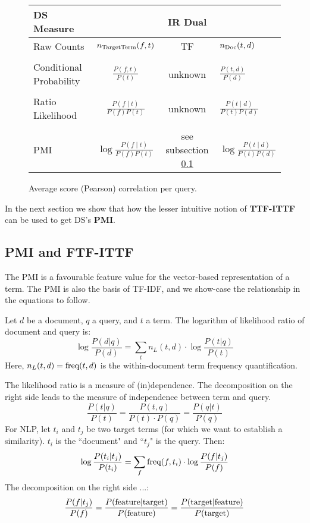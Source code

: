  
\begin{figure*}[htb]
  \centering
  \begin{tabular}{|l|c|c|l|}
  \hline
  DS Measure  && IR Dual &\\
  \hline
 Raw Counts  &$n_{\textmd{TargetTerm}}(f,t)$ & TF &$n_{\textmd{Doc}}(t,d)$\\
 &&&\\
 Conditional Probability &$ \frac{P(f,t)}{P(t)}$ & unknown &$\frac{P(t,d)}{P(d)}$\\
 &&&\\
 Ratio Likelihood & $\frac{P(f \mid t)}{P(f)P(t)}$ & unknown & $\frac{P(t \mid d)}{P(t)P(d)}$\\
 &&&\\
 PMI & $\log{\frac{P(f \mid t)}{P(f)P(t)}}$  & see  subsection \ref{PMI-TF-IDF}&$\log{\frac{P(t \mid d)}{P(t)P(d)}}$\\
 \hline
  \end{tabular}
  \caption{Average score (Pearson) correlation per query.}
  \label{tb-ds-ir}
\end{figure*}

  In the next section we show that how the lesser intuitive notion of  {\bf TTF-ITTF} can be used to get DS's {\bf PMI}. 

\subsection{PMI and FTF-ITTF}
\label{PMI-TF-IDF}

The PMI is a favourable feature value for the vector-based representation
of a term.
The PMI is also the basis of TF-IDF, and we show-case the relationship
in the equations to follow.

Let $d$ be a document, $q$ a query, and $t$ a term.
The logarithm of likelihood ratio of document and query is:
\[
\log\frac{P(d|q)}{P(d)} =
	\sum_t n_L(t,d) \cdot \log\frac{P(t|q)}{P(t)}
\]
Here, $n_L(t,d)=\textmd{freq}(t,d)$ is the within-document term frequency
quantification.

The likelihood ratio is a measure of (in)dependence.
The decomposition on the right side leads to the measure of independence
between term and query.
\[
\frac{P(t|q)}{P(t)} = \frac{P(t,q)}{P(t) \cdot P(q)} = \frac{P(q|t)}{P(q)}
\]
For NLP, let $t_i$ and $t_j$ be two target terms
(for which we want to establish a similarity).
$t_i$ is the ``document" and ``$t_j$" is the query.
Then:
\[
\log\frac{P(t_i|t_j)}{P(t_i)} =
	\sum_f \textmd{freq}(f,t_i) \cdot \log\frac{P(f|t_j)}{P(f)}
\]
The decomposition on the right side ...:
\[
\frac{P(f|t_j)}{P(f)} =
\frac{P(\textmd{feature}|\textmd{target})}{P(\textmd{feature})} =
\frac{P(\textmd{target}|\textmd{feature})}{P(\textmd{target})}
\]


